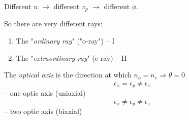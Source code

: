 \documentclass[10pt]{article}
\begin{document}
Different $n$ $\rightarrow$ different $v_p$ $\rightarrow$ different $\phi$.

So there are very different rays:
\begin{enumerate}
\item The "\textit{ordinary ray}" ("o-ray") -- I
\item The "\textit{extraordinary ray}" (e-ray) -- II
\end{enumerate}

The \textit{optical axis} is the direction at which $n_o=n_e \Rightarrow \theta = 0$
\begin{equation*}
\epsilon_x = \epsilon_y \neq \epsilon_z
\end{equation*}
-- one optic axis (uniaxial)
\begin{equation*}
\epsilon_x \neq \epsilon_y \neq \epsilon_z
\end{equation*}
-- two optic axis (biaxial)
\end{document}
